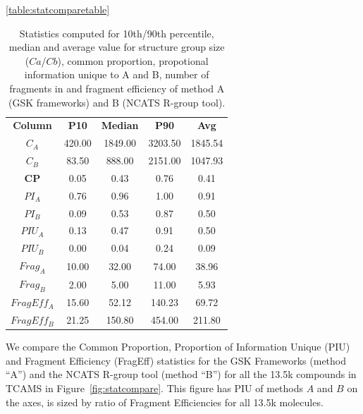 \documentclass[journal=jacsat,manuscript=article]{achemso}
\newcommand*\fref[1]{Figure~\ref{fig:#1}}
\begin{document}
\begin{table}\ref{table:statcomparetable}
  \begin{tabular}{c|ccc|c}
    {\bf Column} & {\bf P10} & {\bf Median} & {\bf P90} & {\bf Avg} \\
    {\bf $C_A$} & 420.00 & 1849.00 & 3203.50 & 1845.54 \\
    {\bf $C_B$} & 83.50 & 888.00 & 2151.00 & 1047.93 \\
    {\bf CP} & 0.05 & 0.43 & 0.76 & 0.41 \\
    {\bf $PI_A$} & 0.76 & 0.96 & 1.00 & 0.91 \\
    {\bf $PI_B$} & 0.09 & 0.53 & 0.87 & 0.50 \\
    {\bf $PIU_A$} & 0.13 & 0.47 & 0.91 & 0.50 \\
    {\bf $PIU_B$} & 0.00 & 0.04 & 0.24 & 0.09 \\
    {\bf $Frag_A$} & 10.00 & 32.00 & 74.00 & 38.96 \\
    {\bf $Frag_B$} & 2.00 & 5.00 & 11.00 & 5.93 \\
    {\bf $FragEff_A$} & 15.60 & 52.12 & 140.23 & 69.72 \\
    {\bf $FragEff_B$} & 21.25 & 150.80 & 454.00 & 211.80
  \end{tabular}
  \caption{Statistics computed for 10th/90th percentile, median and average value for structure group size ($Ca$/$Cb$), common proportion, propotional information unique to A and B, number of fragments in and fragment efficiency of method A (GSK frameworks) and B (NCATS R-group tool).}
\end{table}


We compare the Common Proportion, Proportion of Information Unique (PIU) and Fragment Efficiency (FragEff) statistics for the GSK Frameworks (method ``A'') and the NCATS R-group tool (method ``B'') for all the 13.5k compounds in TCAMS in \fref{statcompare}.  This figure has PIU of methods $A$ and $B$ on the axes, is sized by ratio of Fragment Efficiencies for all 13.5k molecules.   
\end{document}
